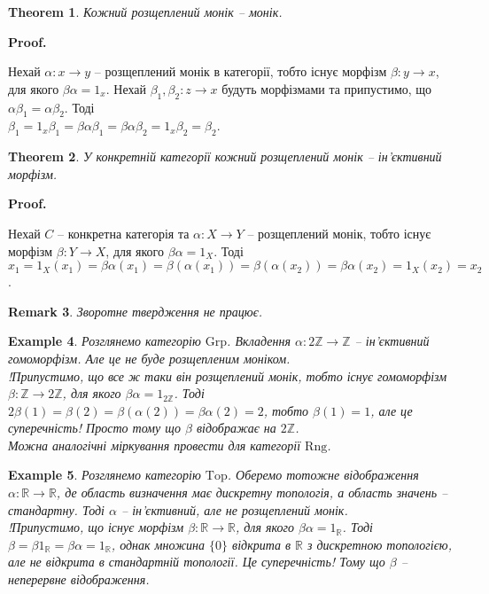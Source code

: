 \documentclass[a4paper, 10pt]{article}
\makeatletter
\theoremstyle{theoremdd}
\newtheorem{theorem}{Theorem}[subsection]
\newtheorem{example}[theorem]{Example}
\newtheorem{remark}[theorem]{Remark}
\renewenvironment{proof}[1][Proof.\\]{\par
\pushQED{\hfill \qed}%
\normalfont \topsep6\p@\@plus6\p@\relax
\trivlist
\item\relax
{\bfseries
#1\@addpunct{.}}\hspace\labelsep\ignorespaces
}{%
\popQED\endtrivlist\@endpefalse
}
\makeatother
\begin{document}
\begin{theorem}
Кожний розщеплений монік -- монік.
\end{theorem}

\begin{proof}
Нехай $\alpha \colon x \to y$ -- розщеплений монік в категорії, тобто існує морфізм $\beta \colon y \to x$, для якого $\beta \alpha = 1_x$. Нехай $\beta_1,\beta_2 \colon z \to x$ будуть морфізмами та припустимо, що $\alpha \beta_1 = \alpha \beta_2$. Тоді \\
$\beta_1 = 1_x \beta_1 = \beta \alpha \beta_1 = \beta \alpha \beta_2 = 1_x \beta_2 = \beta_2$.
\end{proof}

\begin{theorem}
У конкретній категорії кожний розщеплений монік -- ін'єктивний морфізм.
\end{theorem}

\begin{proof}
Нехай $C$ -- конкретна категорія та $\alpha \colon X \to Y$ -- розщеплений монік, тобто існує морфізм $\beta \colon Y \to X$, для якого $\beta \alpha = 1_X$. Тоді\\
$x_1 = 1_X (x_1) = \beta \alpha(x_1) = \beta(\alpha(x_1)) = \beta(\alpha(x_2)) = \beta \alpha(x_2) = 1_X(x_2) = x_2$.
\end{proof}

\begin{remark}
Зворотне твердження не працює.
\end{remark}

\begin{example}
Розглянемо категорію $\text{Grp}$. Вкладення $\alpha \colon 2 \mathbb{Z} \to \mathbb{Z}$ -- ін'єктивний гомоморфізм. Але це не буде розщепленим моніком.\\
!Припустимо, що все ж таки він розщеплений монік, тобто існує гомоморфізм $\beta \colon \mathbb{Z} \to 2 \mathbb{Z}$, для якого $\beta \alpha = 1_{2 \mathbb{Z}}$. Тоді $2 \beta(1) = \beta(2) = \beta(\alpha(2)) = \beta \alpha(2) = 2$, тобто $\beta(1) = 1$, але це суперечність! Просто тому що $\beta$ відображає на $2 \mathbb{Z}$.
\bigskip \\
Можна аналогічні міркування провести для категорії $\text{Rng}$.
\end{example}

\begin{example}
Розглянемо категорію $\text{Top}$. Оберемо тотожне відображення $\alpha \colon \mathbb{R} \to \mathbb{R}$, де область визначення має дискретну топологія, а область значень -- стандартну. Тоді $\alpha$ -- ін'єктивний, але не розщеплений монік.\\
!Припустимо, що існує морфізм $\beta \colon \mathbb{R} \to \mathbb{R}$, для якого $\beta \alpha = 1_\mathbb{R}$. Тоді $\beta = \beta 1_{\mathbb{R}} = \beta \alpha = 1_{\mathbb{R}}$, однак множина $\{0\}$ відкрита в $\mathbb{R}$ з дискретною топологією, але не відкрита в стандартній топології. Це суперечність! Тому що $\beta$ -- неперервне відображення.
\end{example}
\end{document}
